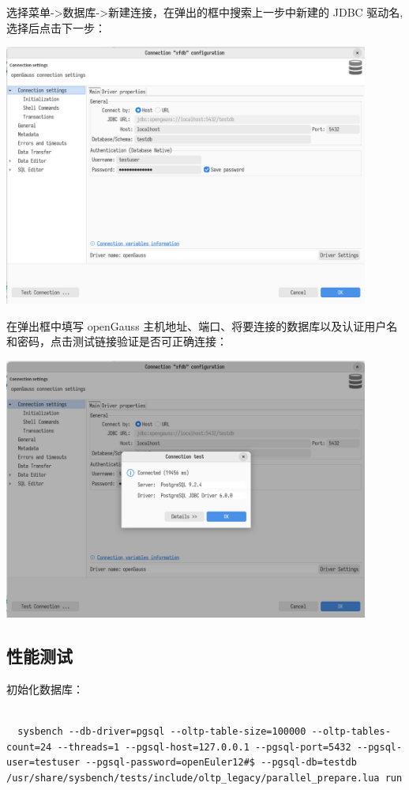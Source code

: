 \documentclass{article}
\begin{document}
选择菜单->数据库->新建连接，在弹出的框中搜索上一步中新建的 JDBC 驱动名,选择后点击下一步：

\begin{center}
\includegraphics[width=12cm]{./image/4.png}
\end{center}

在弹出框中填写 openGauss 主机地址、端口、将要连接的数据库以及认证用户名和密码，点击测试链接验证是否可正确连接：

\begin{center}
\includegraphics[width=12cm]{./image/5.png}
\end{center}


\subsection{性能测试}

初始化数据库：

\begin{verbatim}
  
  sysbench --db-driver=pgsql --oltp-table-size=100000 --oltp-tables-count=24 --threads=1 --pgsql-host=127.0.0.1 --pgsql-port=5432 --pgsql-user=testuser --pgsql-password=openEuler12#$ --pgsql-db=testdb  /usr/share/sysbench/tests/include/oltp_legacy/parallel_prepare.lua run
  
\end{verbatim}
\end{document}
